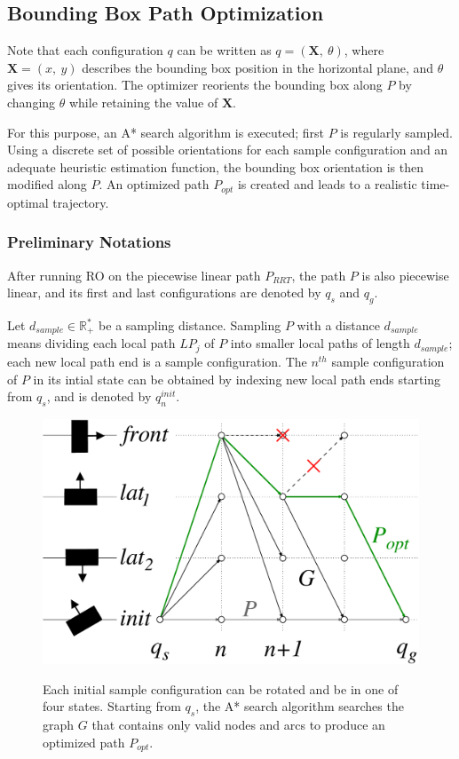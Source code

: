 \subsection{Bounding Box Path Optimization}
\noindent Note that each configuration $q$ can be written as $q =
(\mathbf{X},~\theta)$, where $\mathbf{X} = (x,~y)$ describes the
bounding box position in the horizontal plane, and $\theta$ gives its
orientation.  The optimizer reorients the bounding box along $P$ by
changing $\theta$ while retaining the value of $\mathbf{X}$.

For this purpose, an A* search algorithm is executed; first $P$ is
regularly sampled. Using a discrete set of possible orientations for
each sample configuration and an adequate heuristic estimation
function, the bounding box orientation is then modified along $P$. An
optimized path $P_{opt}$ is created and leads to a realistic
time-optimal trajectory.

\subsubsection{Preliminary Notations}
\noindent After running RO on the piecewise linear path $P_{RRT}$, the
path $P$ is also piecewise linear, and its first and last
configurations are denoted by $q_s$ and $q_g$.

Let $d_{sample} \in \mathbb{R}_+^*$ be a sampling distance. Sampling
$P$ with a distance $d_{sample}$ means dividing each local path $LP_j$
of $P$ into smaller local paths of length $d_{sample}$; each new local
path end is a sample configuration. The $n^{th}$ sample configuration
of $P$ in its intial state can be obtained by indexing new local path
ends starting from $q_s$, and is denoted by $q_n^{init}$.

\begin{figure}
  \centering
      {\includegraphics[width = \linewidth]{src/chap1-path-optimization/A-star.pdf}}
      \caption{Each initial sample configuration can be rotated and be
        in one of four states. Starting from $q_s$, the A* search
        algorithm searches the graph $G$ that contains only valid
        nodes and arcs to produce an optimized path $P_{opt}$.}
      \label{fig:A-star}
\end{figure}

